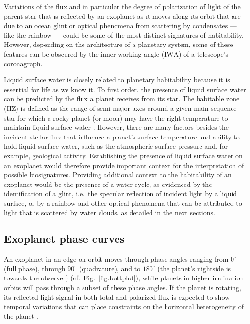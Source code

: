 \documentclass[
    usenatbib,
]{mnras}
\newcommand{\IWA}{\ensuremath{\mathrm{IWA}}}
\begin{document}
Variations of the flux and in particular the degree of polarization of
light of the parent star that is reflected by an exoplanet as it moves
along its orbit that are due to an ocean glint or optical phenomena from scattering by condensates --- like the rainbow --- could be some of the most distinct signatures of habitability.
%
However, depending on the architecture of a planetary system, some of these features can be obscured by the inner working angle (\IWA{}) of a telescope's coronagraph.

Liquid surface water is closely related to planetary habitability because it is essential for life as we know it.
%
To first order, the presence of liquid surface water can be predicted by the flux a planet receives from its star.
%
The habitable zone (HZ) is defined as the range of semi-major axes around a given main sequence star for which a rocky planet (or moon) may have the right temperature to maintain liquid surface water \citep{kasting93}. 
%
However, there are many factors besides the incident stellar flux that influence a planet's surface temperature and ability to hold liquid surface water, such as the atmospheric surface pressure and, for example, geological activity. 
%
Establishing the presence of liquid surface water on an exoplanet would therefore provide important context for the interpretation of possible biosignatures.
%
Providing additional context to the habitability of an exoplanet would be the presence of a water cycle, as evidenced by the identification of a glint, i.e.\ the specular reflection of incident light by a liquid surface, or by a rainbow and other optical phenomena that can be attributed to light that is scattered by water clouds, as detailed in the next sections.


\subsection{Exoplanet phase curves}

An exoplanet in an edge-on orbit moves through phase angles ranging from $0^\circ$ (full phase), through $90^\circ$ (quadrature), and to $180^\circ$ (the planet's nightside is towards the observer) (cf.\ Fig.~\ref{fig:bottplot}), while planets in higher inclination orbits will pass through a subset of these phase angles.
%
If the planet is rotating, its reflected light signal in both total and polarized flux is expected to show temporal variations that can place constraints on the horizontal heterogeneity of the planet \citep{2001Natur.412..885F,stam2008,2022A&A...664A..59M}.
\end{document}
